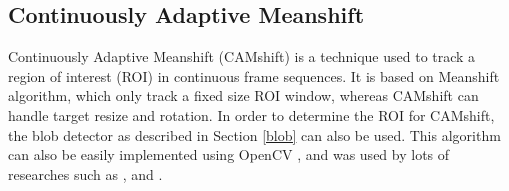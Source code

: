 \subsection{Continuously Adaptive Meanshift}

Continuously Adaptive Meanshift (CAMshift) \cite{bradski1998computer} is a technique used to track a region of interest (ROI) in continuous frame sequences. It is based on Meanshift algorithm, which only track a fixed size ROI window, whereas CAMshift can handle target resize and rotation. In order to determine the ROI for CAMshift, the blob detector as described in Section \ref{blob} can also be used. This algorithm can also be easily implemented using OpenCV \cite{opencv:camshift}, and was used by lots of researches such as \cite{chu2007object}, \cite{xu2012moving} and \cite{nouar2006improved}.

